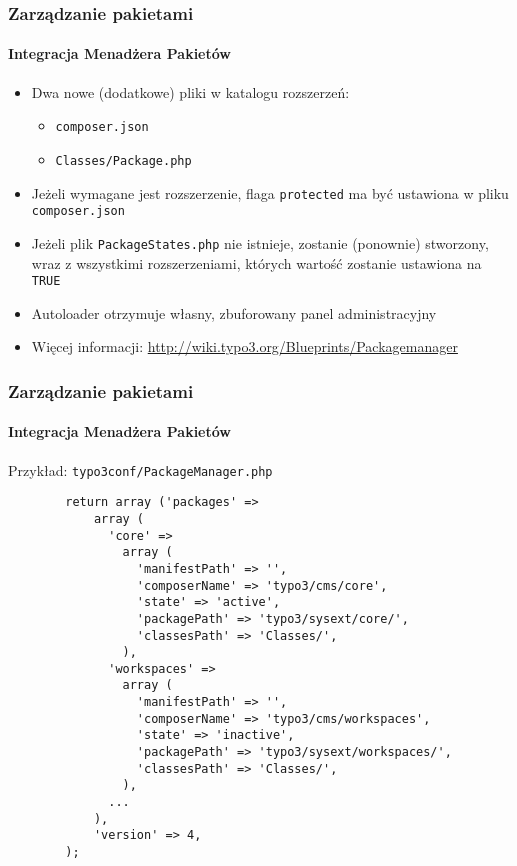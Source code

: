 \begin{frame}[fragile]
	\frametitle{Zarządzanie pakietami}
	\framesubtitle{Integracja Menadżera Pakietów}

	\begin{itemize}

		\item Dwa nowe (dodatkowe) pliki w katalogu rozszerzeń:

			\begin{itemize}
				\item \texttt{composer.json}
				\item \texttt{Classes/Package.php}
			\end{itemize}

		\item Jeżeli wymagane jest rozszerzenie, flaga \texttt{protected} ma być ustawiona w pliku \texttt{composer.json}

		\item Jeżeli plik \texttt{PackageStates.php} nie istnieje, zostanie (ponownie) stworzony,
			wraz z wszystkimi rozszerzeniami, których wartość zostanie ustawiona na \texttt{TRUE}

		\item Autoloader otrzymuje własny, zbuforowany panel administracyjny

		\item Więcej informacji:\newline
			\url{http://wiki.typo3.org/Blueprints/Packagemanager}

	\end{itemize}

\end{frame}


\begin{frame}[fragile]
	\frametitle{Zarządzanie pakietami}
	\framesubtitle{Integracja Menadżera Pakietów}

	Przykład: \texttt{typo3conf/PackageManager.php}

	\lstset{
		basicstyle=\tiny\ttfamily
	}

	\begin{lstlisting}
		return array ('packages' =>
		    array (
		      'core' =>
		        array (
		          'manifestPath' => '',
		          'composerName' => 'typo3/cms/core',
		          'state' => 'active',
		          'packagePath' => 'typo3/sysext/core/',
		          'classesPath' => 'Classes/',
		        ),
		      'workspaces' =>
		        array (
		          'manifestPath' => '',
		          'composerName' => 'typo3/cms/workspaces',
		          'state' => 'inactive',
		          'packagePath' => 'typo3/sysext/workspaces/',
		          'classesPath' => 'Classes/',
		        ),
		      ...
		    ),
		    'version' => 4,
		);
	\end{lstlisting}

\end{frame}

